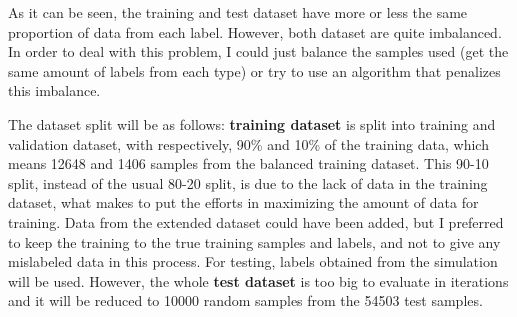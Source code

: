 \documentclass[]{article}
\begin{document}
As it can be seen, the training and test dataset have more or less the same proportion of data from each label. However, both dataset are quite imbalanced. In order to deal with this problem, I could just balance the samples used (get the same amount of labels from each type) or try to use an algorithm that penalizes this imbalance.

The dataset split will be as follows: \textbf{training dataset} is split into training and validation dataset, with respectively, 90\% and 10\% of the training data, which means 12648 and 1406 samples from the balanced training dataset. This 90-10 split, instead of the usual 80-20 split, is due to the lack of data in the training dataset, what makes to put the efforts in maximizing the amount of data for training. Data from the extended dataset could have been added, but I preferred to keep the training to the true training samples and labels, and not to give any mislabeled data in this process. For testing, labels obtained from the simulation will be used. However, the whole \textbf{test dataset} is too big to evaluate in iterations and it will be reduced to 10000 random samples from the 54503 test samples.
\end{document}
